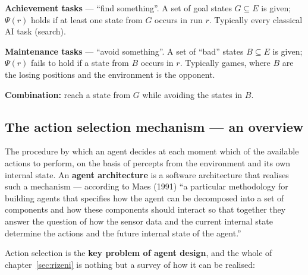 \documentclass[11pt,a4paper]{article}
\theoremstyle{definition}
\providecommand{\uv}[1]{``#1''}
\begin{document}
\begin{defbox}
\textbf{Achievement tasks} --- \uv{find something}. A set of goal states $G \subseteq E$ is given;
$\Psi(r)$ holds if at least one state from $G$ occurs in run $r$. Typically every classical AI task
(search).

\textbf{Maintenance tasks} --- \uv{avoid something}. A set of \uv{bad} states $B \subseteq E$ is
given; $\Psi(r)$ fails to hold if a state from $B$ occurs in $r$. Typically games, where $B$ are
the losing positions and the environment is the opponent.

\textbf{Combination:} reach a state from $G$ while avoiding the states in $B$.
\end{defbox}

\subsection{The action selection mechanism --- an overview}
\label{ssec:vyber-akci}

\begin{defbox}
The procedure by which an agent decides at each moment which of the available actions to perform,
on the basis of percepts from the environment and its own internal state. An \textbf{agent
architecture} is a software architecture that realises such a mechanism --- according to Maes
(1991) \uv{a particular methodology for building agents that specifies how the agent can be
decomposed into a set of components and how these components should interact so that together they
answer the question of how the sensor data and the current internal state determine the actions and
the future internal state of the agent.}
\end{defbox}

Action selection is the \textbf{key problem of agent design}, and the whole of
chapter~\ref{sec:rizeni} is nothing but a survey of how it can be realised:
\end{document}
